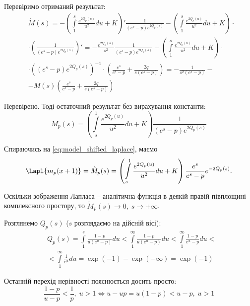 Перевіримо отриманий результат:
\begin{equation*}
\begin{split}
&\dot M(s) = -\left( \int\limits_1^s \frac{e^{2Q_p(u)}}{u^2} du + K \right)' \frac{1}{(e^s - p)  e^{2Q_p(s)}} -\left( \int\limits_1^s \frac{e^{2Q_p(u)}}{u^2} du + K \right)\cdot \\ 
&\cdot \left(\frac{1}{(e^s - p)  e^{2Q_p(s)}}\right)' = -\frac{e^{2Q_p(s)}}{s^2} \frac{1}{(e^s - p)  e^{2Q_p(s)}}  + \left( \int\limits_1^s \frac{e^{2Q_p(u)}}{u^2} du + K \right) \cdot \\
& \cdot \left((e^s - p)  e^{2Q_p(s)}\right)^{-1} \cdot \left(\frac{e^s}{e^s - p}  + \frac{2q}{s(e^s - p)}   \right)= -\frac{1}{s^2(e^s - p)} -\\
&- M(s)\left(\frac{e^s}{e^s - p}  + \frac{2q}{s(e^s - p)}   \right)
\end{split}
\end{equation*}

Перевірено. Тоді остаточний результат без вирахування константи:
\begin{equation}
\label{eq:model_laplace_sol_initial}
M_p(s)= \left( \int\limits_s^1 \frac{e^{2Q_p(u)}}{u^2} du + K \right) \frac{1}{(e^s - p)  e^{2Q_p(s)}}
\end{equation}

Спираючись на \eqref{eq:model_shifted_laplace}, маємо
\begin{equation}
\Lapl{m_p(x+1)} =\tilde M_p(s)= \left( \int\limits_s^1 \frac{e^{2Q_p(u)}}{u^2} du + K \right) \frac{e^s}{e^s - p} e^{- 2Q_p(s)}.
\end{equation}

Оскільки зображення Лапласа – аналітична функція в деякій правій півплощині комплексного простору, то $\tilde M_p(s) \rightarrow 0,\; s \rightarrow +\infty$.

Розглянемо $Q_p(s)$ ($s$ розглядаємо на дійсній вісі):
\begin{equation}
\begin{split}
\label{eq:q_p_s_major}
&Q_p(s) = \int\limits_1^s \frac{1-p}{u(e^u - p)} du <  \int\limits_1^\infty \frac{1 - p}{u(e^u - p)} du < 
\int\limits_1^\infty \frac{1- p}{e^u - p} du<\\
&< \int\limits_1^\infty \frac{1}{e^u} du = \exp(-1) - \exp(-\infty) = \exp(-1)
\end{split}
\end{equation}

Останній перехід нерівності пояснюється досить просто:
$$
\frac{1-p}{u - p} < \frac{1}{p}, \; u > 1 \Leftrightarrow u - u p = u(1-p) < u - p, \; u > 1
$$

